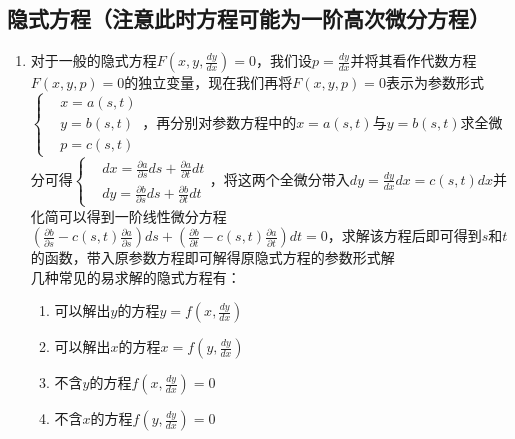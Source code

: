 \documentclass[12pt,a4paper,UTF8]{book}
\begin{document}
\subsection{隐式方程（注意此时方程可能为一阶高次微分方程）}
\begin{enumerate}
\item 对于一般的隐式方程$F\left(x,y,\frac{dy}{dx}\right)=0$，我们设$p=\frac{dy}{dx}$并将其看作代数方程$F\left(x,y,p\right)=0$的独立变量，现在我们再将$F\left(x,y,p\right)=0$表示为参数形式$\left\{\begin{aligned}&x=a\left(s,t\right)\\&y=b\left(s,t\right)\\&p=c\left(s,t\right)\end{aligned}\right.$，再分别对参数方程中的$x=a\left(s,t\right)$与$y=b\left(s,t\right)$求全微分可得$\left\{\begin{aligned}&dx=\frac{\partial a}{\partial s}ds+\frac{\partial a}{\partial t}dt\\&dy=\frac{\partial b}{\partial s}ds+\frac{\partial b}{\partial t}dt\end{aligned}\right.$，将这两个全微分带入$dy=\frac{dy}{dx}dx=c\left(s,t\right)dx$并化简可以得到一阶线性微分方程$\left(\frac{\partial b}{\partial s}-c\left(s,t\right)\frac{\partial a}{\partial s}\right)ds+\left(\frac{\partial b}{\partial t}-c\left(s,t\right)\frac{\partial a}{\partial t}\right)dt=0$，求解该方程后即可得到$s$和$t$的函数，带入原参数方程即可解得原隐式方程的参数形式解\\
几种常见的易求解的隐式方程有：
\begin{enumerate}
\item 可以解出$y$的方程$y=f\left(x,\frac{dy}{dx}\right)$
\item 可以解出$x$的方程$x=f\left(y,\frac{dy}{dx}\right)$
\item 不含$y$的方程$f\left(x,\frac{dy}{dx}\right)=0$
\item 不含$x$的方程$f\left(y,\frac{dy}{dx}\right)=0$
\end{enumerate}
\end{enumerate}
\end{document}
